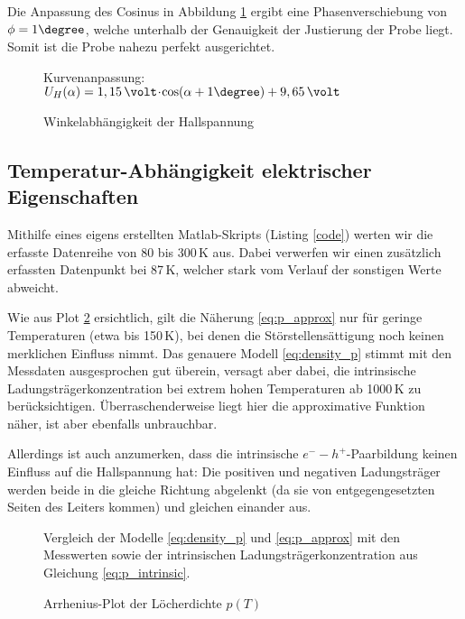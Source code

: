 Die Anpassung des Cosinus in Abbildung \ref{fig:plot_alpha} ergibt eine Phasenverschiebung von $\phi = 1\degree$, welche unterhalb der Genauigkeit der Justierung der Probe liegt. Somit ist die Probe nahezu perfekt ausgerichtet.

\begin{figure}[p]
\centering

\caption{Winkelabhängigkeit der Hallspannung}
\label{fig:plot_alpha}
\vspace{-0.5ex}
Kurvenanpassung: $U_H(\alpha) = 1,15 \,\volt \cdt \cos (\alpha + 1\degree) + 9,65\,\volt$
\vspace{-7em}
\end{figure}

\newpage
\subsection{Temperatur-Abhängigkeit elektrischer Eigenschaften} 
Mithilfe eines eigens erstellten Matlab-Skripts (Listing \ref{code}) werten wir die erfasste Datenreihe von 80 bis 300\,K aus. Dabei verwerfen wir einen zusätzlich erfassten Datenpunkt bei 87\,K, welcher stark vom Verlauf der sonstigen Werte abweicht.

Wie aus Plot \ref{fig:plot_p} ersichtlich, gilt die Näherung \eqref{eq:p_approx} nur für geringe Temperaturen (etwa bis 150\,K), bei denen die Störstellensättigung noch keinen merklichen Einfluss nimmt. Das genauere Modell \eqref{eq:density_p} stimmt mit den Messdaten ausgesprochen gut überein, versagt aber dabei, die intrinsische Ladungsträgerkonzentration bei extrem hohen Temperaturen ab 1000\,K zu berücksichtigen.
Überraschenderweise liegt hier die approximative Funktion näher, ist aber ebenfalls unbrauchbar.

Allerdings ist auch anzumerken, dass die intrinsische $e^- - h^+$-Paarbildung keinen Einfluss auf die Hallspannung hat: Die positiven und negativen Ladungsträger werden beide in die gleiche Richtung abgelenkt (da sie von entgegengesetzten Seiten des Leiters kommen) und gleichen einander aus.

\begin{figure}[p]
\centering
\begin{sideways}

\end{sideways}
\caption{Arrhenius-Plot der Löcherdichte $p(T)$}
\label{fig:plot_p}
\vspace{1ex}
Vergleich der Modelle \eqref{eq:density_p} und \eqref{eq:p_approx} mit den Messwerten sowie der intrinsischen Ladungsträgerkonzentration aus Gleichung \eqref{eq:p_intrinsic}.
\end{figure}

